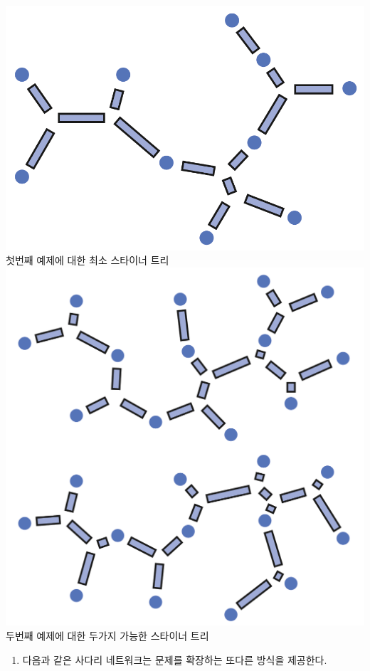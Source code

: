 \documentclass[]{article}
\begin{document}
\includegraphics{csunplugged/04-part/img/ch16-steiner/15-steiner-06-first-example.png}
첫번째 예제에 대한 최소 스타이너 트리
\includegraphics{csunplugged/04-part/img/ch16-steiner/15-steiner-06-second-example.png}
두번째 예제에 대한 두가지 가능한 스타이너 트리

\begin{enumerate}
\itemsep1pt\parskip0pt
\item
  다음과 같은 사다리 네트워크는 문제를 확장하는 또다른 방식을 제공한다.
\end{enumerate}
\end{document}
